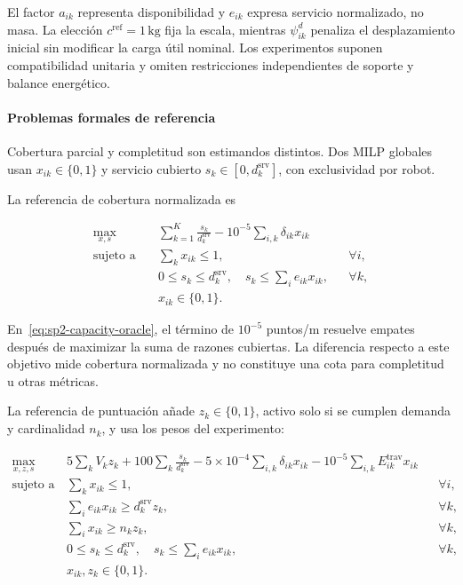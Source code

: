 El factor $a_{ik}$ representa disponibilidad y $e_{ik}$ expresa servicio normalizado, no masa. La elección $c^{\mathrm{ref}}=1\,\mathrm{kg}$ fija la escala, mientras $\psi_{ik}^d$ penaliza el desplazamiento inicial sin modificar la carga útil nominal. Los experimentos suponen compatibilidad unitaria y omiten restricciones independientes de soporte y balance energético.

\paragraph{Problemas formales de referencia}

Cobertura parcial y completitud son estimandos distintos. Dos MILP globales usan $x_{ik}\in\{0,1\}$ y servicio cubierto $s_k\in[0,d_k^{\mathrm{srv}}]$, con exclusividad por robot.

La referencia de cobertura normalizada es

\begin{equation}
\label{eq:sp2-capacity-oracle}
\begin{aligned}
  \max_{x,s}\quad
  & \sum_{k=1}^{K}\frac{s_k}{d_k^{\mathrm{srv}}}
    -10^{-5}\sum_{i,k}\delta_{ik}x_{ik} \\
  \text{sujeto a}\quad
  & \sum_k x_{ik}\leq1, && \forall i,\\
  & 0\leq s_k\leq d_k^{\mathrm{srv}},\quad s_k\leq\sum_i e_{ik}x_{ik}, && \forall k,\\
  & x_{ik}\in\{0, 1\}. &&
\end{aligned}
\end{equation}

En~\eqref{eq:sp2-capacity-oracle}, el término de $10^{-5}$ puntos/m resuelve empates después de maximizar la suma de razones cubiertas. La diferencia respecto a este objetivo mide cobertura normalizada y no constituye una cota para completitud u otras métricas.

La referencia de puntuación añade $z_k\in\{0, 1\}$, activo solo si se cumplen demanda y cardinalidad $n_k$, y usa los pesos del experimento:

\begin{equation}
\label{eq:sp2-score-oracle}
\begin{aligned}
  \max_{x,z,s}\quad
  & 5\sum_k V_kz_k
    +100\sum_k\frac{s_k}{d_k^{\mathrm{srv}}}
    -5\times10^{-4}\sum_{i,k}\delta_{ik}x_{ik}
    -10^{-5}\sum_{i,k}E_{ik}^{\mathrm{trav}}x_{ik} \\
  \text{sujeto a}\quad
  & \sum_kx_{ik}\leq1, && \forall i,\\
  & \sum_i e_{ik}x_{ik}\geq d_k^{\mathrm{srv}}z_k, && \forall k,\\
  & \sum_i x_{ik}\geq n_kz_k, && \forall k,\\
  & 0\leq s_k\leq d_k^{\mathrm{srv}},\quad s_k\leq\sum_i e_{ik}x_{ik}, && \forall k,\\
  & x_{ik},z_k\in\{0, 1\}. &&
\end{aligned}
\end{equation}

